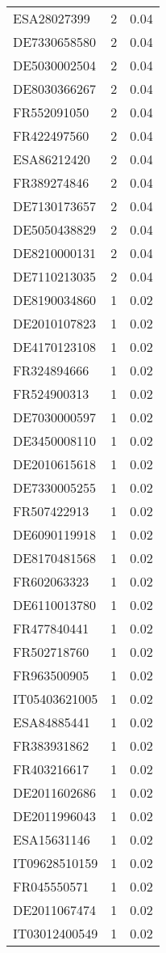 \begin{table*}[htbp]
\begin{tabular}{lrr}
ESA28027399 & 2 & 0.04 \\
DE7330658580 & 2 & 0.04 \\
DE5030002504 & 2 & 0.04 \\
DE8030366267 & 2 & 0.04 \\
FR552091050 & 2 & 0.04 \\
FR422497560 & 2 & 0.04 \\
ESA86212420 & 2 & 0.04 \\
FR389274846 & 2 & 0.04 \\
DE7130173657 & 2 & 0.04 \\
DE5050438829 & 2 & 0.04 \\
DE8210000131 & 2 & 0.04 \\
DE7110213035 & 2 & 0.04 \\
DE8190034860 & 1 & 0.02 \\
DE2010107823 & 1 & 0.02 \\
DE4170123108 & 1 & 0.02 \\
FR324894666 & 1 & 0.02 \\
FR524900313 & 1 & 0.02 \\
DE7030000597 & 1 & 0.02 \\
DE3450008110 & 1 & 0.02 \\
DE2010615618 & 1 & 0.02 \\
DE7330005255 & 1 & 0.02 \\
FR507422913 & 1 & 0.02 \\
DE6090119918 & 1 & 0.02 \\
DE8170481568 & 1 & 0.02 \\
FR602063323 & 1 & 0.02 \\
DE6110013780 & 1 & 0.02 \\
FR477840441 & 1 & 0.02 \\
FR502718760 & 1 & 0.02 \\
FR963500905 & 1 & 0.02 \\
IT05403621005 & 1 & 0.02 \\
ESA84885441 & 1 & 0.02 \\
FR383931862 & 1 & 0.02 \\
FR403216617 & 1 & 0.02 \\
DE2011602686 & 1 & 0.02 \\
DE2011996043 & 1 & 0.02 \\
ESA15631146 & 1 & 0.02 \\
IT09628510159 & 1 & 0.02 \\
FR045550571 & 1 & 0.02 \\
DE2011067474 & 1 & 0.02 \\
IT03012400549 & 1 & 0.02 \\

\end{tabular}
\end{table*}
